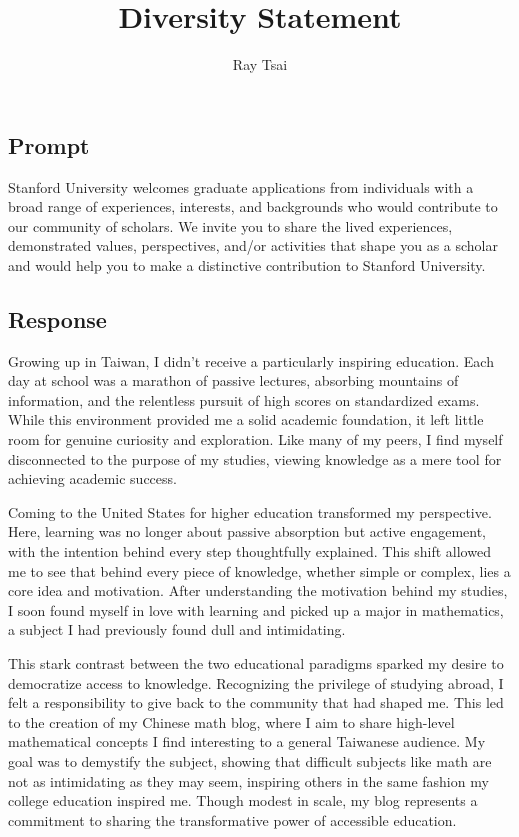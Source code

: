 \documentclass[12pt]{article}
\title{Diversity Statement}
\author{Ray Tsai}
\date{}
\begin{document}
\maketitle

\vspace{-0.25in}

\subsection*{Prompt}

Stanford University welcomes graduate applications from individuals with a broad range of
experiences, interests, and backgrounds who would contribute to our community of scholars. We invite
you to share the lived experiences, demonstrated values, perspectives, and/or activities that shape
you as a scholar and would help you to make a distinctive contribution to Stanford University.

\subsection*{Response}

Growing up in Taiwan, I didn't receive a particularly inspiring education. Each day at school was a
marathon of passive lectures, absorbing mountains of information, and the relentless pursuit of high
scores on standardized exams. While this environment provided me a solid academic foundation, it
left little room for genuine curiosity and exploration. Like many of my peers, I find myself
disconnected to the purpose of my studies, viewing knowledge as a mere tool for achieving academic
success.

Coming to the United States for higher education transformed my perspective. Here, learning was no
longer about passive absorption but active engagement, with the intention behind every step
thoughtfully explained. This shift allowed me to see that behind every piece of knowledge, whether
simple or complex, lies a core idea and motivation. After understanding the motivation behind my
studies, I soon found myself in love with learning and picked up a major in mathematics, a subject I
had previously found dull and intimidating. 

This stark contrast between the two educational paradigms sparked my desire to democratize access to
knowledge. Recognizing the privilege of studying abroad, I felt a responsibility to give back to the
community that had shaped me. This led to the creation of my Chinese math blog, where I aim to share
high-level mathematical concepts I find interesting to a general Taiwanese audience. My goal was to
demystify the subject, showing that difficult subjects like math are not as intimidating as they may
seem, inspiring others in the same fashion my college education inspired me. Though modest in scale,
my blog represents a commitment to sharing the transformative power of accessible education.
\end{document}
